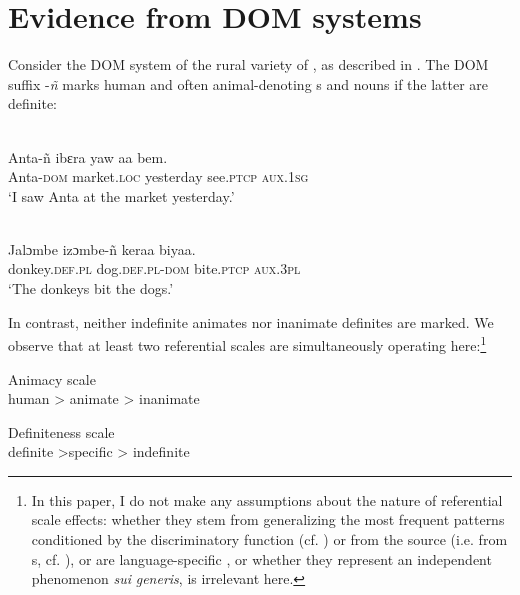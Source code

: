 \documentclass[output=paper]{langsci/langscibook}
\begin{document}
\section{Evidence from DOM systems}\label{sec:serzant:3}

Consider the DOM system of the rural variety of , as described in \citet{Culy1995}. The DOM suffix \nobreakdash-\textit{ñ} marks human and often animal-denoting s and nouns if the latter are definite:

\ea\label{ex:serzant:4}
\\
\gll   Anta-ñ     ibɛra     yaw     aa      bem.\\
     Anta-\textsc{dom}  market.\textsc{loc}  yesterday  see.\textsc{ptcp} \textsc{aux.1sg}\\
\glt ‘I saw Anta at the market yesterday.’
\z

\ea\label{ex:serzant:5}
\\
\gll  Jalɔmbe   izɔmbe-ñ     keraa     biyaa.\\
     donkey.\textsc{def.pl} dog.\textsc{def.pl-dom}   bite.\textsc{ptcp}   \textsc{aux.3pl}\\
\glt ‘The donkeys bit the dogs.’
\z

\noindent In contrast, neither indefinite animates nor inanimate definites are marked. We observe that at least two referential scales are simultaneously operating here:\footnote{In this paper, I do not make any assumptions about the nature of referential scale effects: whether they stem from generalizing the most frequent patterns conditioned by the discriminatory function (cf. \citealt{Aissen2003}) or from the source (i.e. from s, cf. \citealt{DalrympleNikolaeva2011}), or are language-specific \citep{BickelEtAl2015}, or whether they represent an independent phenomenon \textit{sui} \textit{generis}, is irrelevant here.}

\newpage

\ea\label{ex:serzant:6}
Animacy scale\\
human > animate > inanimate
\z

\ea\label{ex:serzant:7}
Definiteness scale\\
definite >specific > indefinite
\z
\end{document}
